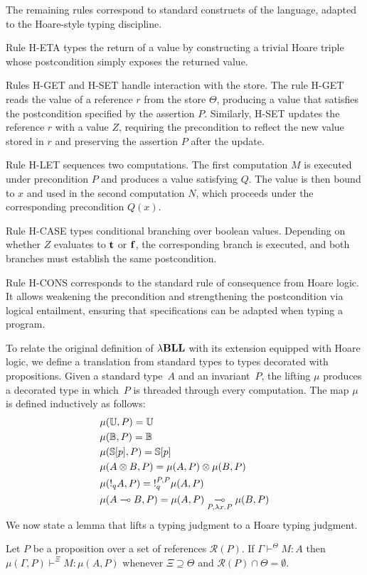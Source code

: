 The remaining rules correspond to standard constructs of the language, adapted to the Hoare-style typing discipline. 

Rule H-ETA types the return of a value by constructing a trivial Hoare triple whose postcondition simply exposes the returned value. 

Rules H-GET and H-SET handle interaction with the store. The rule H-GET reads the value of a reference $r$ from the store $\Theta$, producing a value that satisfies the postcondition specified by the assertion $P$. Similarly, H-SET updates the reference $r$ with a value $Z$, requiring the precondition to reflect the new value stored in $r$ and preserving the assertion $P$ after the update.

Rule H-LET sequences two computations. The first computation $M$ is executed under precondition $P$ and produces a value satisfying $Q$. The value is then bound to $x$ and used in the second computation $N$, which proceeds under the corresponding precondition $Q(x)$.

Rule H-CASE types conditional branching over boolean values. Depending on whether $Z$ evaluates to $\mathbf{t}$ or $\mathbf{f}$, the corresponding branch is executed, and both branches must establish the same postcondition.

Rule H-CONS corresponds to the standard rule of consequence from Hoare logic.
It allows weakening the precondition and strengthening the postcondition via logical entailment, ensuring that specifications can be adapted when typing a program.

To relate the original definition of ${\lambda}\mathbf{BLL}$ with its extension equipped with Hoare logic, we define a translation from standard types to types decorated with propositions. Given a standard type~$A$ and an invariant~$P$, the lifting $\mu$ produces a decorated type in which~$P$ is threaded through every computation. The map $\mu$ is defined inductively as follows:
\begin{align}
\begin{split}
&\mu(\mathbb{U}, P) = \mathbb{U} \label{eq:mu} \\
&\mu(\mathbb{B}, P) = \mathbb{B} \\
&\mu(\mathbb{S}[p], P) = \mathbb{S}[p] \\
&\mu(A \otimes B, P) = \mu(A, P) \otimes \mu(B, P) \\
&\mu(\mathord{!}_q A, P) = \mathord{!}_q^{P,P} \mu(A, P) \\
&\mu(A \multimap B, P) = \mu(A, P) \underset{P, \lambda x.P}{\multimap} \mu(B, P)
\end{split}    
\end{align}
We now state a lemma that lifts a typing judgment to a Hoare typing judgment.
\begin{lemma}\label{lemma:hoare-lifting}
Let $P$ be a proposition over a set of references $\mathcal{R}(P)$.
If $\Gamma \vdash^{\Theta} M : A$ then $\mu(\Gamma, P) \vdash^{\Xi} M: \mu(A, P)$ whenever $\Xi \supseteq \Theta$ and $\mathcal{R}(P) \cap \Theta = \emptyset$.
\end{lemma}

